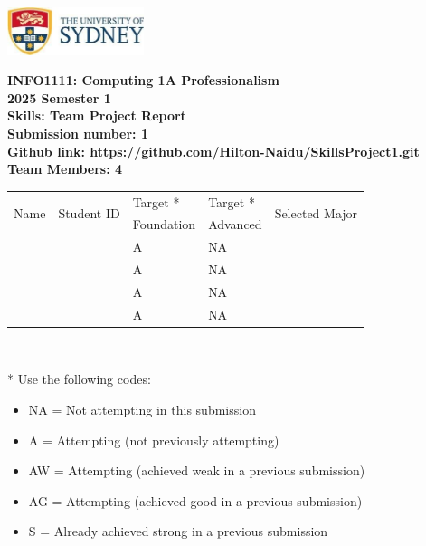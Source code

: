 \documentclass[a4paper, 11pt]{report}
\begin{document}
\begin{titlepage}
\begin{flushright}
\includegraphics[width=4cm]{USyd.jpg}\\[1cm]
\end{flushright}

\begin{centering}
\textbf{\huge INFO1111: Computing 1A Professionalism}\\[0.75cm]
\textbf{\huge 2025 Semester 1}\\[2cm]
\textbf{\huge Skills: Team Project Report}\\[2cm]

\textbf{\large Submission number: 1}\\[0.5cm]
\textbf{\large Github link: https://github.com/Hilton-Naidu/SkillsProject1.git }\\[0.75cm]
\textbf{\huge Team Members: 4}\\[0.75cm]

\begin{tabular}{|p{}|p{}|p{}|p{}|p{}|}
	\hline
	\multirow{2}{*}{Name} & \multirow{2}{*}{Student ID} & Target * & Target * & \multirow{2}{*}{Selected Major} \\
	 & & Foundation & Advanced & \\
	\hline
	\hline
	\raggedright{\studA} & \sidA & A & NA & \majA \\
	\hline
	\raggedright{\studB} & \sidB & A & NA & \majB \\
	\hline
	\raggedright{\studC} & \sidC & A & NA & \majC \\
	\hline
	\raggedright{\studD} & \sidD & A & NA & \majD \\
	\hline
\end{tabular}
\\[0.5cm]
\end{centering}

* Use the following codes:
\begin{itemize}
\setlength\itemsep{0em}
\item NA = Not attempting in this submission
\item A = Attempting (not previously attempting)
\item AW = Attempting (achieved weak in a previous submission) 
\item AG = Attempting (achieved good in a previous submission)
\item S = Already achieved strong in a previous submission
\end{itemize}

\thispagestyle{empty}
\end{titlepage}
\end{document}
